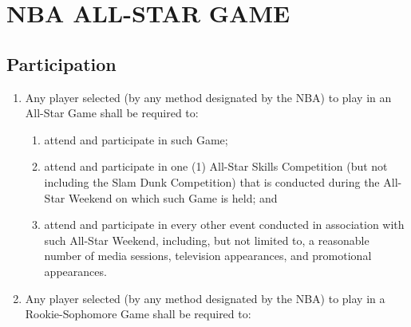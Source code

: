 \documentclass[
]{book}
\providecommand{\tightlist}{%
  \setlength{\itemsep}{0pt}\setlength{\parskip}{0pt}}
\begin{document}
\hypertarget{nba-all-star-game}{%
\chapter{NBA ALL-STAR GAME}\label{nba-all-star-game}}

\hypertarget{participation}{%
\section{Participation}\label{participation}}

\begin{enumerate}
\def\labelenumi{(\alph{enumi})}
\tightlist
\item
  Any player selected (by any method designated by the NBA) to play in an All-Star Game shall be required to:

  \begin{enumerate}
  \def\labelenumii{(\roman{enumii})}
  \tightlist
  \item
    attend and participate in such Game;
  \item
    attend and participate in one (1) All-Star Skills Competition (but not including the Slam Dunk Competition) that is conducted during the All-Star Weekend on which such Game is held; and
  \item
    attend and participate in every other event conducted in association with such All-Star Weekend, including, but not limited to, a reasonable number of media sessions, television appearances, and promotional appearances.
  \end{enumerate}
\item
  Any player selected (by any method designated by the NBA) to play in a Rookie-Sophomore Game shall be required to:


\end{enumerate}
\end{document}
